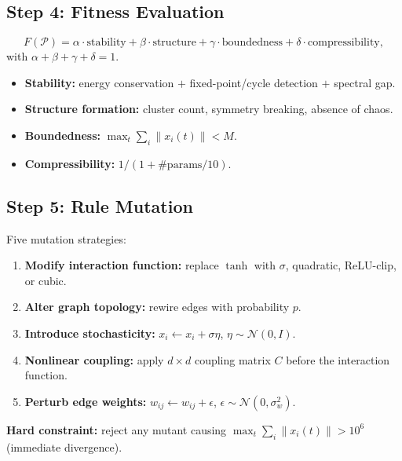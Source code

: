 \subsection{Step 4: Fitness Evaluation}

\begin{equation}\label{eq:mppk-fitness}
  F(\mathcal{P}) =
    \alpha\cdot\mathrm{stability}
  + \beta\cdot\mathrm{structure}
  + \gamma\cdot\mathrm{boundedness}
  + \delta\cdot\mathrm{compressibility},
\end{equation}
with $\alpha+\beta+\gamma+\delta=1$.

\begin{itemize}[nosep]
  \item \textbf{Stability:} energy conservation $+$ fixed-point/cycle
        detection $+$ spectral gap.
  \item \textbf{Structure formation:} cluster count, symmetry breaking,
        absence of chaos.
  \item \textbf{Boundedness:} $\max_t\sum_i\|x_i(t)\| < M$.
  \item \textbf{Compressibility:} $1/(1+\#\text{params}/10)$.
\end{itemize}

\subsection{Step 5: Rule Mutation}

Five mutation strategies:
\begin{enumerate}[nosep]
  \item \textbf{Modify interaction function:} replace $\tanh$ with
        $\sigma$, quadratic, ReLU-clip, or cubic.
  \item \textbf{Alter graph topology:} rewire edges with probability $p$.
  \item \textbf{Introduce stochasticity:}
        $x_i \leftarrow x_i + \sigma\eta$, $\eta\sim\mathcal{N}(0,I)$.
  \item \textbf{Nonlinear coupling:} apply $d\times d$ coupling matrix $C$
        before the interaction function.
  \item \textbf{Perturb edge weights:}
        $w_{ij} \leftarrow w_{ij} + \epsilon$, $\epsilon\sim\mathcal{N}(0,\sigma_w^2)$.
\end{enumerate}

\noindent\textbf{Hard constraint:} reject any mutant causing
$\max_t\sum_i\|x_i(t)\| > 10^6$ (immediate divergence).

